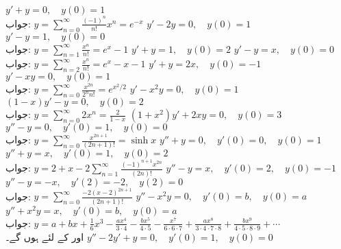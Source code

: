 $y'+y=0,\quad y(0)=1$\\
جواب:\quad
$y=\sum_{n=0}^{\infty}\tfrac{(-1)^n}{n!}x^n=e^{-x}$
$y'-2y=0,\quad y(0)=1$
$y'-y=1,\quad y(0)=0$\\
جواب:\quad
$y=\sum_{n=1}^{\infty}\tfrac{x^n}{n!}=e^x-1$
$y'+y=1,\quad y(0)=2$
$y'-y=x,\quad y(0)=0$\\
جواب:\quad
$y=\sum_{n=2}^{\infty}\tfrac{x^n}{n!}=e^x-x-1$
$y'+y=2x,\quad y(0)=-1$
$y'-xy=0,\quad y(0)=1$\\
جواب:\quad
$y=\sum_{n=0}^{\infty}\tfrac{x^{2n}}{2^nn!}=e^{x^2/2}$
$y'-x^2y=0,\quad y(0)=1$
$(1-x)y'-y=0,\quad y(0)=2$\\
جواب:\quad
$y=\sum_{n=0}^{\infty}2x^n=\tfrac{2}{1-x}$
$(1+x^2)y'+2xy=0,\quad y(0)=3$
$y''-y=0,\quad y'(0)=1,\quad y(0)=0$\\
جواب:\quad
$y=\sum_{n=0}^{\infty}\tfrac{x^{2n+1}}{(2n+1)!}=\sinh x$
$y''+y=0,\quad y'(0)=0,\quad y(0)=1$
$y''+y=x,\quad y'(0)=1,\quad y(0)=2$\\
جواب:\quad
$y=2+x-2\sum_{n=1}^{\infty}\tfrac{(-1)^{n+1}x^{2n}}{(2n)!}$
$y''-y=x,\quad y'(0)=2,\quad y(0)=-1$
$y''-y=-x,\quad y'(2)=-2,\quad y(2)=0$\\
جواب:\quad
$y=\sum_{n=0}^{\infty}\tfrac{-2(x-2)^{2n+1}}{(2n+1)!}$
$y''-x^2y=0,\quad y'(0)=b,\quad y(0)=a$
$y''+x^2y=x,\quad y'(0)=b,\quad y(0)=a$\\
جواب:\quad
$y=a+bx+\tfrac{1}{6}x^3-\tfrac{ax^4}{3\cdot 4}-\tfrac{bx^5}{4\cdot 5}-\tfrac{x^7}{6\cdot6\cdot7}+\tfrac{ax^8}{3\cdot4\cdot7\cdot8}+\tfrac{bx^9}{4\cdot5\cdot8\cdot9}+\cdots$\\
اور  کے لئے  ہوں گے۔
$y''-2y'+y=0,\quad y'(0)=1,\quad y(0)=0$

